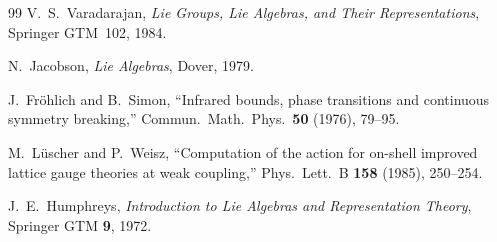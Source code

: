 \documentclass[11pt]{article}
\theoremstyle{definition}
\begin{document}
\begin{thebibliography}{99}
 V.~S.~Varadarajan,
  \emph{Lie Groups, Lie Algebras, and Their
  Representations},
  Springer GTM~102, 1984.

 N.~Jacobson,
  \emph{Lie Algebras},
  Dover, 1979.

 J.~Fr\"ohlich and B.~Simon,
  ``Infrared bounds, phase transitions and continuous
  symmetry breaking,''
  Commun.\ Math.\ Phys.\ \textbf{50} (1976), 79--95.

 M.~L\"uscher and P.~Weisz,
  ``Computation of the action for on-shell improved
  lattice gauge theories at weak coupling,''
  Phys.\ Lett.\ B \textbf{158} (1985), 250--254.

 J.~E.~Humphreys,
  \emph{Introduction to Lie Algebras and Representation
  Theory}, Springer GTM \textbf{9}, 1972.


\end{thebibliography}
\end{document}
